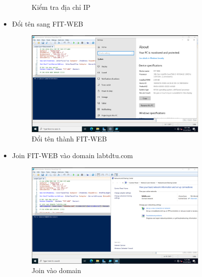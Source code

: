\documentclass[13pt]{report}
\begin{document}
\begin{itemize}
\begin{figure}[htp]
			\caption{Kiểm tra địa chỉ IP}
		\end{figure}
		\item Đổi tên sang FIT-WEB
		\begin{figure}[htp]
			\centering
			\includegraphics[width=0.85\textwidth]{image/PowerShell/FIT-WEB/3.png}
			\caption{Đổi tên thành FIT-WEB}
		\end{figure}
		\newpage
		\item Join FIT-WEB vào domain labtdtu.com
		\begin{figure}[htp]
			\centering
			\includegraphics[width=0.85\textwidth]{image/PowerShell/FIT-WEB/4.png}
			\caption{Join vào domain}
		\end{figure}	
	\end{itemize}
\end{document}
